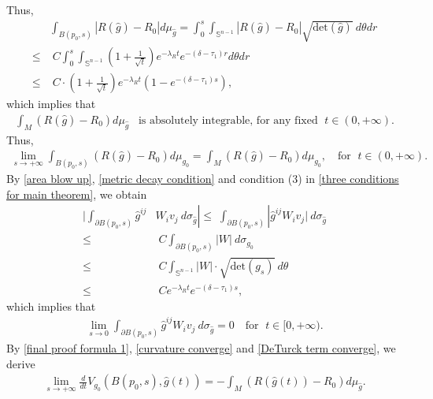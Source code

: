 \documentclass[12pt]{amsart}
\begin{document}
Thus, 
\begin{equation}\label{curvature decay}
    \begin{split}
        &\int_{B(p_0, s)}|R(\hat{g}) - R_0|d\mu_{\hat{g}} =\int_{0}^{s}\int_{\mathbb{S}^{n - 1}}|R(\hat{g}) - R_0|\sqrt{\mathrm{det}(\hat{g})}\ d\theta dr\\
        \leq&\;  C\int_{0}^{s}\int_{\mathbb{S}^{n - 1}} \left(1 + \frac{1}{\sqrt{t}} \right) e^{-\lambda_R t} e^{-(\delta - \tau_1)r} d\theta dr\\
        \leq&\; C \cdot \left(1 + \frac{1}{\sqrt{t}} \right) e^{- \lambda_R t} (1 - e^{- (\delta - \tau_1) s}), 
    \end{split}
\end{equation}
which implies that 
\begin{align}\label{curvature converge}
    \int_{M}(R(\hat{g}) - R_0)d\mu_{\hat{g}}\;\;\;  \text{is absolutely integrable, for any fixed }\; t\in (0, +\infty).   
\end{align}
Thus, 
\begin{align}
    \lim_{s\rightarrow +\infty} \int_{B(p_0, s)} (R(\hat{g}) - R_0)d\mu_{g_0} = \int_{M} (R(\hat{g}) - R_0) d\mu_{g_0},\quad \text{for }\; t\in (0, +\infty). 
\end{align}
By \eqref{area blow up}, \eqref{metric decay condition} and condition (3) in \eqref{three conditions for main theorem}, we obtain
\begin{equation}\label{DeTurck term decay process}
    \begin{split}
        |\int_{\partial B(p_0, s)}\hat{g}^{ij}& W_i v_j\ d\sigma_{\hat{g}}|\leq\; \int_{\partial B(p_0, s)}|\hat{g}^{ij} W_i v_j|\ d\sigma_{\hat{g}}\\
        \leq&\; C\int_{\partial B(p_0, s)} |W|\ d\sigma_{g_{0}}\\
        \leq&\; C\int_{\mathbb{S}^{n - 1}}|W|\cdot\sqrt{\mathrm{det}(g_s)}\ d\theta \\
        \leq&\; Ce^{-\lambda_R t}e^{-(\delta - \tau_1)s},
    \end{split}
\end{equation}
which implies that 
\begin{align}\label{DeTurck term converge}
    \lim_{s\rightarrow 0}\int_{\partial B(p_0, s)}\hat{g}^{ij} W_i v_j\ d\sigma_{\hat{g}} = 0\quad \text{for }\; t\in [0, +\infty). 
\end{align}
By \eqref{final proof formula 1}, \eqref{curvature converge} and \eqref{DeTurck term converge}, we derive 
\begin{equation}\label{outer limit}
    \begin{split}
        \lim_{s\rightarrow +\infty}\frac{d}{dt} V_{g_0}(B(p_0, s), \hat{g}(t)) = - \int_{M} (R(\hat{g}(t)) - R_0) d\mu_{\hat{g}}. 
    \end{split}
\end{equation} 
\end{document}
